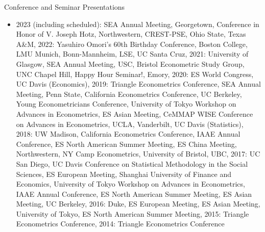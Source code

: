 \documentclass{article}
\begin{document}
\bigskip\noindent Conference and Seminar Presentations
\begin{itemize}
\item[] 
2023 (including scheduled): 
SEA Annual Meeting, 
Georgetown,
Conference in Honor of V. Joseph Hotz,
Northwestern, 
CREST-PSE,
Ohio State, 
Texas A\&M, 
2022: 
Yasuhiro Omori's 60th Birthday Conference,
Boston College, 
LMU Munich,
Bonn-Mannheim, 
LSE,
UC Santa Cruz,
2021: 
University of Glasgow, 
SEA Annual Meeting, 
USC,
Bristol Econometric Study Group,
UNC Chapel Hill, 
Happy Hour Seminar!, 
Emory,
2020: 
ES World Congress, 
UC Davis (Economics),
2019: 
Triangle Econometrics Conference, 
SEA Annual Meeting, 
Penn State, 
California Econometrics Conference, 
UC Berkeley,
Young Econometricians Conference,
University of Tokyo Workshop on Advances in Econometrics, 
ES Asian Meeting,
CeMMAP WISE Conference on Advances in Econometrics,
UCLA,
Vanderbilt,
UC Davis (Statistics),
2018: 
UW Madison,
California Econometrics Conference,
IAAE Annual Conference,
ES North American Summer Meeting,
ES China Meeting,
Northwestern,
NY Camp Econometrics,
University of Bristol,
UBC,
2017: 
UC San Diego,
UC Davis Conference on Statistical Methodology in the Social Sciences,
ES European Meeting,
Shanghai University of Finance and Economics,
University of Tokyo Workshop on Advances in Econometrics,
IAAE Annual Conference,
ES North American Summer Meeting,
ES Asian Meeting,
UC Berkeley,
2016: 
Duke,
ES European Meeting,
ES Asian Meeting,
University of Tokyo,
ES North American Summer Meeting,
2015: 
Triangle Econometrics Conference,
2014: 
Triangle Econometrics Conference
\end{itemize}
\end{document}
